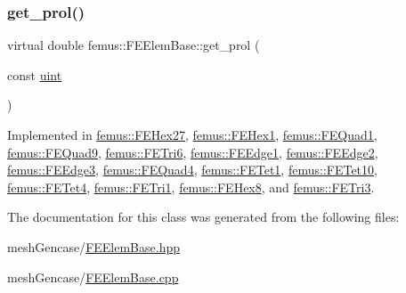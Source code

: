 \mbox{\label{classfemus_1_1_f_e_elem_base_ac82326cdc7cb02329c7be9547d56fad4}} 
\subsubsection{\texorpdfstring{get\+\_\+prol()}{get\_prol()}}
{\footnotesize\ttfamily virtual double femus\+::\+F\+E\+Elem\+Base\+::get\+\_\+prol (\begin{DoxyParamCaption}\item[{const \mbox{\hyperlink{_typedefs_8hpp_a91ad9478d81a7aaf2593e8d9c3d06a14}{uint}}}]{ }\end{DoxyParamCaption})\hspace{0.3cm}{\ttfamily [pure virtual]}}



Implemented in \mbox{\hyperlink{classfemus_1_1_f_e_hex27_aa0a6cf0465e5c48c4b5ebf4a4e407124}{femus\+::\+F\+E\+Hex27}}, \mbox{\hyperlink{classfemus_1_1_f_e_hex1_ac9745cc75964e76795dbca432939df53}{femus\+::\+F\+E\+Hex1}}, \mbox{\hyperlink{classfemus_1_1_f_e_quad1_af157e342c76e4f964bfe669501a1752d}{femus\+::\+F\+E\+Quad1}}, \mbox{\hyperlink{classfemus_1_1_f_e_quad9_ab4f40a93ba2ea9c54243a8b0d8402edc}{femus\+::\+F\+E\+Quad9}}, \mbox{\hyperlink{classfemus_1_1_f_e_tri6_a8e08d8a2985f51295992730f2d13c299}{femus\+::\+F\+E\+Tri6}}, \mbox{\hyperlink{classfemus_1_1_f_e_edge1_a65a8e90e45a7db19520776609184a51f}{femus\+::\+F\+E\+Edge1}}, \mbox{\hyperlink{classfemus_1_1_f_e_edge2_a11dc956a09fc9775f474d388eab1de21}{femus\+::\+F\+E\+Edge2}}, \mbox{\hyperlink{classfemus_1_1_f_e_edge3_a5ecf7d9b06c59a94e3f1da042afe2b71}{femus\+::\+F\+E\+Edge3}}, \mbox{\hyperlink{classfemus_1_1_f_e_quad4_a9e4a6666afa17aa1f3842c32b15d67fe}{femus\+::\+F\+E\+Quad4}}, \mbox{\hyperlink{classfemus_1_1_f_e_tet1_aa0de96383fcaaaa22f35ea9a2780d660}{femus\+::\+F\+E\+Tet1}}, \mbox{\hyperlink{classfemus_1_1_f_e_tet10_a7aa7d792698ab0e0e39bef7575642117}{femus\+::\+F\+E\+Tet10}}, \mbox{\hyperlink{classfemus_1_1_f_e_tet4_a28b82560cde667962c16ad58ec0def9c}{femus\+::\+F\+E\+Tet4}}, \mbox{\hyperlink{classfemus_1_1_f_e_tri1_a0884505ef66c9b96487c9faaff0a0c5d}{femus\+::\+F\+E\+Tri1}}, \mbox{\hyperlink{classfemus_1_1_f_e_hex8_aa84066edfa5cac347255b6e8f2098cf5}{femus\+::\+F\+E\+Hex8}}, and \mbox{\hyperlink{classfemus_1_1_f_e_tri3_aa7d2dc636ad0e4b18782beac8bd927ef}{femus\+::\+F\+E\+Tri3}}.



The documentation for this class was generated from the following files\+:\begin{DoxyCompactItemize}
\item 
mesh\+Gencase/\mbox{\hyperlink{_f_e_elem_base_8hpp}{F\+E\+Elem\+Base.\+hpp}}\item 
mesh\+Gencase/\mbox{\hyperlink{_f_e_elem_base_8cpp}{F\+E\+Elem\+Base.\+cpp}}\end{DoxyCompactItemize}
